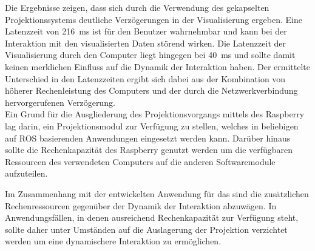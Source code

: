 
Die Ergebnisse zeigen, dass sich durch die Verwendung des gekapselten Projektionssystems deutliche Verzögerungen in der Visualisierung ergeben. Eine Latenzzeit von \SI{216}{\milli\second} ist für den Benutzer wahrnehmbar und kann bei der Interaktion mit den visualisierten Daten störend wirken. Die Latenzzeit der Visualisierung durch den Computer liegt hingegen bei \SI{40}{\milli\second} und sollte damit keinen merklichen Einfluss auf die Dynamik der Interaktion haben. Der ermittelte Unterschied in den Latenzzeiten ergibt sich dabei aus der Kombination von höherer Rechenleistung des Computers und der  durch die Netzwerkverbindung hervorgerufenen Verzögerung.\\

Ein Grund für die Ausgliederung des Projektionsvorgangs mittels des Raspberry lag darin, ein Projektionsmodul zur Verfügung zu stellen, welches in beliebigen auf ROS basierenden Anwendungen eingesetzt werden kann. Darüber hinaus sollte die Rechenkapazität des Raspberry genutzt werden um die verfügbaren Ressourcen des verwendeten Computers auf die anderen Softwaremodule aufzuteilen.\\

\prever{
}

Im Zusammenhang mit der entwickelten Anwendung für das \kps{} sind die zusätzlichen Rechenressourcen gegenüber der Dynamik der Interaktion abzuwägen. In Anwendungsfällen, in denen ausreichend Rechenkapazität zur Verfügung steht, sollte daher unter Umständen auf die Auslagerung der Projektion verzichtet werden um eine dynamischere Interaktion zu ermöglichen.